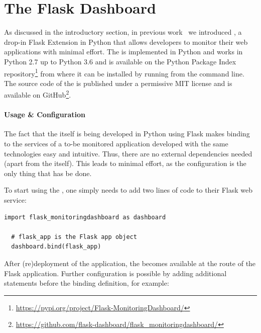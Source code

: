 \documentclass[conference]{IEEEtran}
\begin{document}
\section{The Flask Dashboard}
\label{sec:tool}


  As discussed in the introductory section, in previous work~\cite{vogel2017low} we introduced \tool, a drop-in Flask Extension in Python that allows developers to monitor their web applications with minimal effort.
%
  The \tool is implemented in Python and works in Python 2.7 up to Python 3.6 and is available on the Python Package Index repository\footnote{\url{https://pypi.org/project/Flask-MonitoringDashboard/}} from where it can be installed by running \install from the command line. 
%  
  The source code of the \tool is published under a permissive MIT license and is available on GitHub\footnote{\url{https://github.com/flask-dashboard/flask_monitoringdashboard/}}.
  
  \paragraph{Usage \& Configuration}
  
  The fact that the \tool itself is being developed in Python using Flask makes binding to the services of a to-be monitored application developed with the same technologies easy and intuitive. Thus, there are no external dependencies needed (apart from the \tool itself). This leads to minimal effort, as the configuration is the only thing that has be done.

  To start using the \tool, one simply needs to add two lines of code to their Flask web service:

  \begin{lstlisting}[style=custompython, caption=Configuring the \tool is straightforward]
  import flask_monitoringdashboard as dashboard

  # flask_app is the Flask app object
  dashboard.bind(flask_app)
  \end{lstlisting}

  After (re)deployment of the application, the \tool becomes available at the  route of the Flask application. Further configuration is possible by adding additional statements before the binding definition, for example:
\end{document}
